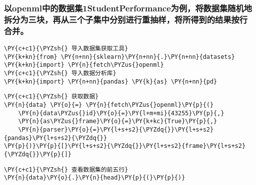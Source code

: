     \hypertarget{ux4ee5openmlux4e2dux7684ux6570ux636eux96c61studentperformanceux4e3aux4f8bux5c06ux6570ux636eux96c6ux968fux673aux5730ux62c6ux5206ux4e3aux4e09ux5757ux518dux4eceux4e09ux4e2aux5b50ux96c6ux4e2dux5206ux522bux8fdbux884cux91cdux62bdux6837ux5c06ux6240ux5f97ux5230ux7684ux7ed3ux679cux6309ux884cux5408ux5e76}{%
\subsubsection{以openml中的数据集1StudentPerformance为例，将数据集随机地拆分为三块，再从三个子集中分别进行重抽样，将所得到的结果按行合并。}\label{ux4ee5openmlux4e2dux7684ux6570ux636eux96c61studentperformanceux4e3aux4f8bux5c06ux6570ux636eux96c6ux968fux673aux5730ux62c6ux5206ux4e3aux4e09ux5757ux518dux4eceux4e09ux4e2aux5b50ux96c6ux4e2dux5206ux522bux8fdbux884cux91cdux62bdux6837ux5c06ux6240ux5f97ux5230ux7684ux7ed3ux679cux6309ux884cux5408ux5e76}}

    \begin{tcolorbox}[breakable, size=fbox, boxrule=1pt, pad at break*=1mm,colback=cellbackground, colframe=cellborder]
\begin{Verbatim}[commandchars=\\\{\}]
\PY{c+c1}{\PYZsh{} 导入数据集获取工具}
\PY{k+kn}{from} \PY{n+nn}{sklearn}\PY{n+nn}{.}\PY{n+nn}{datasets} \PY{k+kn}{import} \PY{n}{fetch\PYZus{}openml}
\PY{c+c1}{\PYZsh{} 导入数据分析库}
\PY{k+kn}{import} \PY{n+nn}{pandas} \PY{k}{as} \PY{n+nn}{pd}
\end{Verbatim}
\end{tcolorbox}

    \begin{tcolorbox}[breakable, size=fbox, boxrule=1pt, pad at break*=1mm,colback=cellbackground, colframe=cellborder]
\begin{Verbatim}[commandchars=\\\{\}]
\PY{c+c1}{\PYZsh{} 获取数据}
\PY{n}{data} \PY{o}{=} \PY{n}{fetch\PYZus{}openml}\PY{p}{(}
    \PY{n}{data\PYZus{}id}\PY{o}{=}\PY{l+m+mi}{43255}\PY{p}{,}
    \PY{n}{as\PYZus{}frame}\PY{o}{=}\PY{k+kc}{True}\PY{p}{,}
    \PY{n}{parser}\PY{o}{=}\PY{l+s+s2}{\PYZdq{}}\PY{l+s+s2}{pandas}\PY{l+s+s2}{\PYZdq{}}
\PY{p}{)}\PY{p}{[}\PY{l+s+s2}{\PYZdq{}}\PY{l+s+s2}{frame}\PY{l+s+s2}{\PYZdq{}}\PY{p}{]}
\end{Verbatim}
\end{tcolorbox}

    \begin{tcolorbox}[breakable, size=fbox, boxrule=1pt, pad at break*=1mm,colback=cellbackground, colframe=cellborder]
\begin{Verbatim}[commandchars=\\\{\}]
\PY{c+c1}{\PYZsh{} 查看数据集的前五行}
\PY{n}{data}\PY{o}{.}\PY{n}{head}\PY{p}{(}\PY{p}{)}
\end{Verbatim}
\end{tcolorbox}

